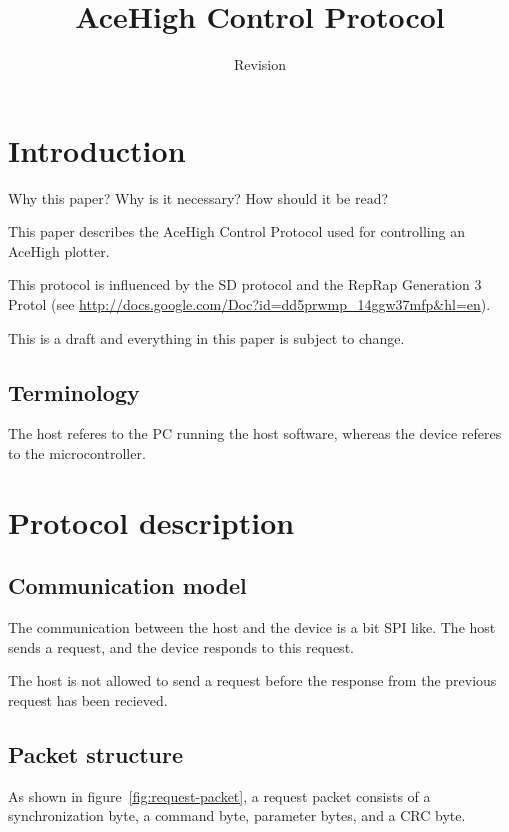 \documentclass[11pt,a4paper,oneside]{memoir}
\title{AceHigh Control Protocol}
\date{Revision \svnInfoRevision}
\begin{document}
\maketitle

\tableofcontents*

\chapter{Introduction}

Why this paper? Why is it necessary? How should it be read?

This paper describes the AceHigh Control Protocol used for controlling
an AceHigh plotter.

This protocol is influenced by the SD protocol and the RepRap
Generation 3 Protol (see
\url{http://docs.google.com/Doc?id=dd5prwmp_14ggw37mfp&hl=en}).

This is a draft and everything in this paper is subject to change.


\section{Terminology}

The host referes to the PC running the host software, whereas the
device referes to the microcontroller.


\chapter{Protocol description}


\section{Communication model}

The communication between the host and the device is a bit SPI
like. The host sends a request, and the device responds to this
request.

The host is not allowed to send a request before the response from the
previous request has been recieved.


\section{Packet structure}

As shown in figure~\ref{fig:request-packet}, a request packet consists
of a synchronization byte, a command byte, parameter bytes, and a CRC
byte.
\end{document}
